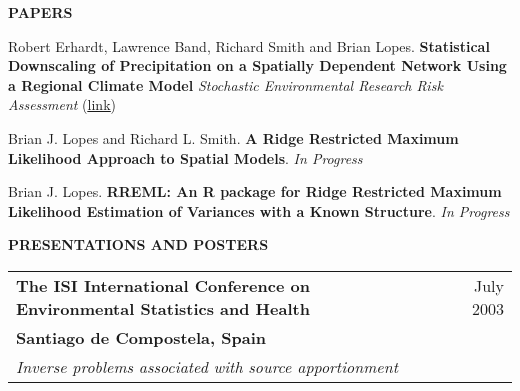 \documentclass[letterpaper,10pt]{article}
\newcommand{\BJLhref}[2]{\href{#1}{\color{blue}\setulcolor{blue}\ul{#2}}}
\newcommand{\secspace}{7pt}
\begin{document}
\vspace{\secspace}

\begin{center} {\large \textbf{PAPERS}}\\
\vspace{-10pt}{\centering \rule{1\columnwidth}{0.2pt}\par}
\end{center}
\vspace{-2pt}

Robert Erhardt, Lawrence Band, Richard Smith and Brian
Lopes. \textbf{Statistical Downscaling of Precipitation on a Spatially
  Dependent Network Using a Regional Climate Model} \textit{Stochastic
  Environmental Research Risk Assessment} (\BJLhref{http://link.springer.com/article/10.1007/s00477-014-0988-y}{link})



\vspace{3pt}

Brian J. Lopes and Richard L. Smith.  \textbf{A Ridge Restricted
  Maximum Likelihood Approach to Spatial Models}. \textit{In Progress}

\vspace{3pt}

Brian J. Lopes.  \textbf{RREML: An R package for Ridge Restricted
  Maximum Likelihood Estimation of Variances with a Known Structure}.
\textit{In Progress}

\begin{center} {\large \textbf{PRESENTATIONS AND POSTERS}}\\
\vspace{-10pt}{\centering \rule{1\columnwidth}{0.2pt}\par}
\end{center}
\vspace{-2pt}

\begin{tabular*}{7.5in}{l@{\extracolsep{\fill}}r} \textbf{The ISI
    International Conference on Environmental Statistics and Health} &
  July 2003\\ \textbf{Santiago de Compostela, Spain} &\\ \emph{Inverse
    problems associated with source apportionment} &
\end{tabular*}
\end{document}
